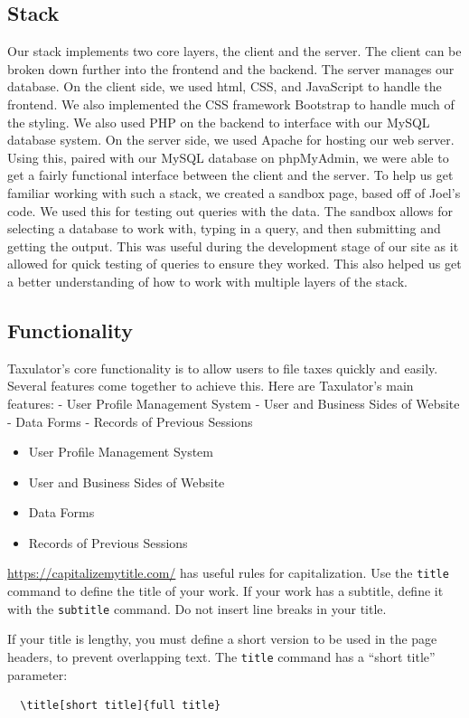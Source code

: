 \documentclass[sigconf]{acmart}
\begin{document}
\subsection{Stack}
Our stack implements two core layers, the client and the server. The client can be broken down further into the frontend and the backend. The server manages our database.
On the client side, we used html, CSS, and JavaScript to handle the frontend. We also implemented the CSS framework Bootstrap to handle much of the styling. We also used PHP on the backend to interface with our MySQL database system.
On the server side, we used Apache for hosting our web server. Using this, paired with our MySQL database on phpMyAdmin, we were able to get a fairly functional interface between the client and the server.
To help us get familiar working with such a stack, we created a sandbox page, based off of Joel’s code. We used this for testing out queries with the data. The sandbox allows for selecting a database to work with, typing in a query, and then submitting and getting the output. This was useful during the development stage of our site as it allowed for quick testing of queries to ensure they worked. This also helped us get a better understanding of how to work with multiple layers of the stack.
\subsection{Functionality}
Taxulator’s core functionality is to allow users to file taxes quickly and easily. Several features come together to achieve this. Here are Taxulator’s main features:
-	User Profile Management System
-	User and Business Sides of Website
-	Data Forms
-	Records of Previous Sessions
\begin{itemize}
\item User Profile Management System
\item User and Business Sides of Website
\item Data Forms
\item Records of Previous Sessions
\end{itemize}


\url{https://capitalizemytitle.com/} has useful rules for
capitalization. Use the {\verb|title|} command to define the title of
your work. If your work has a subtitle, define it with the
{\verb|subtitle|} command.  Do not insert line breaks in your title.

If your title is lengthy, you must define a short version to be used
in the page headers, to prevent overlapping text. The \verb|title|
command has a ``short title'' parameter:
\begin{verbatim}
  \title[short title]{full title}
\end{verbatim}
\end{document}
